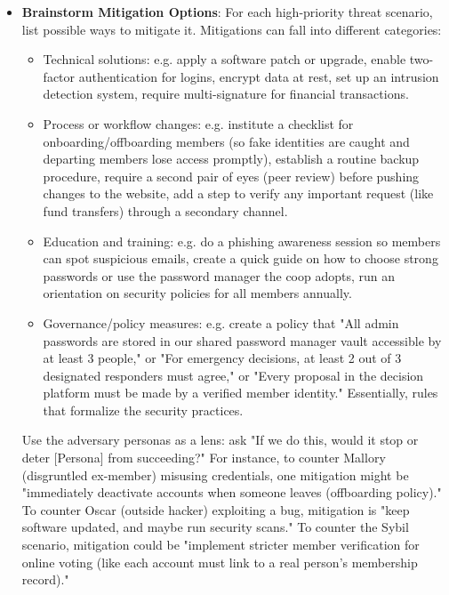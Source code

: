 \begin{itemize}

    \item \textbf{Brainstorm Mitigation Options}: For each high-priority threat scenario, list possible ways to mitigate
    it. Mitigations can fall into different categories:
        \begin{itemize}   
            \item Technical solutions: e.g. apply a software patch or upgrade, enable two-factor authentication
    for logins, encrypt data at rest, set up an intrusion detection system, require multi-signature for financial
    transactions.
            \item Process or workflow changes: e.g. institute a checklist for onboarding/offboarding members (so
    fake identities are caught and departing members lose access promptly), establish a routine backup procedure,
    require a second pair of eyes (peer review) before pushing changes to the website, add a step to verify any
    important request (like fund transfers) through a secondary channel.
            \item Education and training: e.g. do a phishing awareness session so members can spot suspicious
    emails, create a quick guide on how to choose strong passwords or use the password manager the coop adopts,
    run an orientation on security policies for all members annually.
            \item Governance/policy measures: e.g. create a policy that "All admin passwords are stored in our
    shared password manager vault accessible by at least 3 people," or "For emergency decisions, at least 2 out of
    3 designated responders must agree," or "Every proposal in the decision platform must be made by a verified
    member identity." Essentially, rules that formalize the security practices.
        \end{itemize}
    
    Use the adversary personas as a lens: ask "If we do this, would it stop or deter [Persona] from succeeding?"
    For instance, to counter Mallory (disgruntled ex-member) misusing credentials, one mitigation might be
    "immediately deactivate accounts when someone leaves (offboarding policy)." To counter Oscar (outside hacker)
    exploiting a bug, mitigation is "keep software updated, and maybe run security scans." To counter the Sybil
    scenario, mitigation could be "implement stricter member verification for online voting (like each account
    must link to a real person's membership record)."


\end{itemize}
